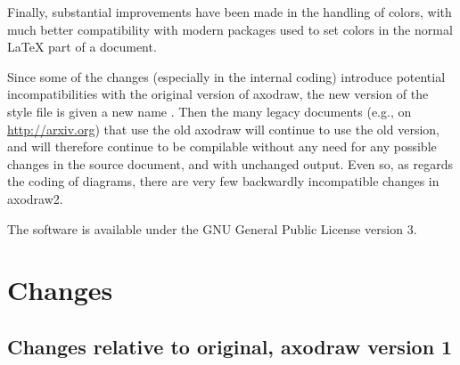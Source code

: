 \documentclass[12pt]{article}
\begin{document}
Finally, substantial improvements have been made in the handling of
colors, with much better compatibility with modern packages used to
set colors in the normal \LaTeX{} part of a document.

Since some of the changes (especially in the internal coding)
introduce potential incompatibilities with the original version of
axodraw, the new version of the style file is given a new name
.  Then the many legacy documents (e.g., on
\url{http://arxiv.org}) that use the old axodraw will continue to use
the old version, and will therefore continue to be compilable without
any need for any possible changes in the source document, and with unchanged
output.  Even so, as regards the coding of diagrams, there are very
few backwardly incompatible changes in axodraw2.

The software is available under the GNU General Public License
\cite{GPL} version 3.



\section{Changes}
\label{sec:changes}

\subsection{Changes relative to original, axodraw version 1}
\label{sec:changes.wrt.1}
\end{document}

